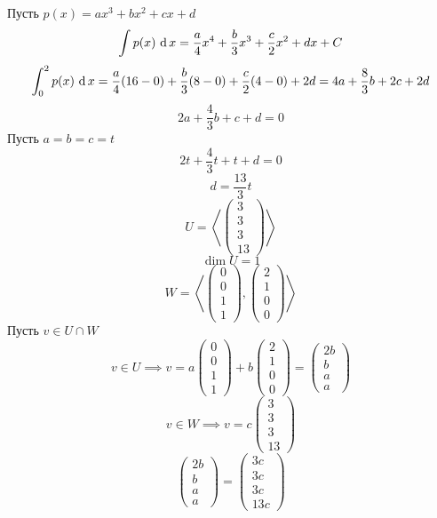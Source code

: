 Пусть $ p(x) = ax^3 + bx^2 + cx + d $
$$ \uint{p(x)} = \frac{a}4x^4 + \frac{b}3x^3 + \half[c]x^2 + dx + C $$
$$ \dint02{p(x)} = \frac{a}4(16 - 0) + \frac{b}3(8 - 0) + \half[c](4 - 0) + 2d = 4a + \frac83b + 2c + 2d $$
$$ 2a + \frac43b + c + d = 0 $$
Пусть $ a = b = c = t $
$$ 2t + \frac43t + t + d = 0 $$
$$ d = \frac{13}3t $$
$$ U = \left\langle
\begin{pmatrix}
	3 \\
    3 \\
    3 \\
    13
\end{pmatrix} \right\rangle $$
$$ \dim U = 1 $$
$$ W = \left\langle
\begin{pmatrix}
	0 \\
    0 \\
    1 \\
    1
\end{pmatrix},
\begin{pmatrix}
	2 \\
    1 \\
    0 \\
    0
\end{pmatrix} \right\rangle $$
Пусть $ v \in U \cap W $
$$ v \in U \implies v = a
\begin{pmatrix}
	0 \\
    0 \\
    1 \\
    1
\end{pmatrix} + b
\begin{pmatrix}
	2 \\
    1 \\
    0 \\
    0
\end{pmatrix} =
\begin{pmatrix}
    2b \\
    b \\
    a \\
    a
\end{pmatrix} $$
$$ v \in W \implies v = c
\begin{pmatrix}
	3 \\
    3 \\
    3 \\
    13
\end{pmatrix} $$
$$
\begin{pmatrix}
	2b \\
    b \\
    a \\
    a
\end{pmatrix} =
\begin{pmatrix}
	3c \\
    3c \\
    3c \\
    13c
\end{pmatrix} $$
